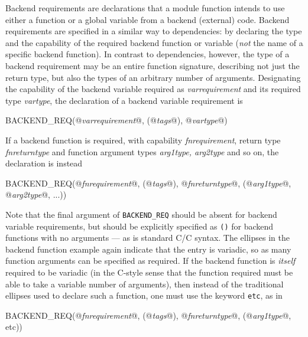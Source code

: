 \documentclass[pdftex,twocolumn,epjc3_preprint,runningheads]{svjour3}
\renewcommand{\_}{\discretionary{\underscore}{}{\underscore}}
\newcommand{\metavarf}[1]{\textit{\color{darkgreen}\footnotesize\textrm{#1}}}
\newcommand{\metavar}{\metavarf}
\newcommand\xx{\raisebox{0.2ex}{\smaller ++}\xspace}
\newcommand\Cpp{\textsf{C\xx}\xspace}
\newcommand\plainC{\textsf{C}\xspace}
\begin{document}
Backend requirements are declarations that a module function intends to use either a function or a global variable from a backend (external) code.  Backend requirements are specified in a similar way to dependencies: by declaring the type and the capability of the required backend function or variable (\textit{not} the name of a specific backend function).  In contrast to dependencies, however, the type of a backend requirement may be an entire function signature, describing not just the return type, but also the types of an arbitrary number of arguments.  Designating the capability of the backend variable required as \metavar{var\_requirement} and its required type \metavar{var\_type}, the declaration of a backend variable requirement is
\begin{lstcpp}
BACKEND_REQ(@\metavar{var\_requirement}@, (@\metavar{tags}@), @\metavar{var\_type}@)
\end{lstcpp}
If a backend function is required, with capability \metavar{fn\_requirement}, return type \metavar{fn\_return\_type} and function argument types \metavar{arg1\_type, arg2\_type} and so on, the declaration is instead
\begin{lstcpp}
BACKEND_REQ(@\metavar{fn\_requirement}@, (@\metavar{tags}@), @\metavar{fn\_return\_type}@,
 (@\metavar{arg1\_type}@, @\metavar{arg2\_type}@, ...))
\end{lstcpp}
Note that the final argument of \lstinline{BACKEND_REQ} should be absent for backend variable requirements, but should be explicitly specified as \lstinline{()} for backend functions with no arguments --- as is standard \plainC/\Cpp syntax.  The ellipses in the backend function example again indicate that the entry is variadic, so as many function arguments can be specified as required.  If the backend function is \textit{itself} required to be variadic (in the \plainC-style sense that the function required must be able to take a variable number of arguments), then instead of the traditional ellipses used to declare such a function, one must use the keyword \lstinline{etc}, as in
\begin{lstcpp}
BACKEND_REQ(@\metavar{fn\_requirement}@, (@\metavar{tags}@), @\metavar{fn\_return\_type}@,
 (@\metavar{arg1\_type}@, etc))
\end{lstcpp}
\end{document}
